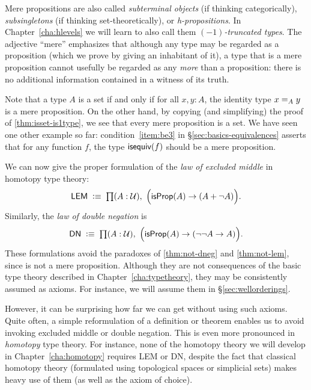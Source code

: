 Mere propositions are also called \emph{subterminal objects} (if thinking categorically), \emph{subsingletons} (if thinking set-theoretically), or \emph{h-propositions}.
In Chapter~\ref{cha:hlevels} we will learn to also call them \emph{$(-1)$-truncated types}.
The adjective ``mere'' emphasizes that although any type may be regarded as a proposition (which we prove by giving an inhabitant of it), a type that is a mere proposition cannot usefully be regarded as any \emph{more} than a proposition: there is no additional information contained in a witness of its truth.

Note that a type $A$ is a set if and only if for all $x,y:A$, the identity type $\id[A]xy$ is a mere proposition.
On the other hand, by copying (and simplifying) the proof of \autoref{thm:isset-is1type}, we see that every mere proposition is a set.
We have seen one other example so far: condition~\ref{item:be3} in \S\ref{sec:basics-equivalences} asserts that for any function $f$, the type $\isequiv (f)$ should be a mere proposition.


We can now give the proper formulation of the \emph{law of excluded middle} in homotopy type theory:
\begin{equation}
  \label{eq:lem}
  \mathsf{LEM}\;\defeq\;
  \prd{A:\UU} \Big(\isprop(A) \to (A + \neg A)\Big).
\end{equation}
Similarly, the \emph{law of double negation} is
\begin{equation}
  \label{eq:ldn}
  \mathsf{DN}\;\defeq\;
  \prd{A:\UU} \Big(\isprop(A) \to (\neg\neg A \to A)\Big).
\end{equation}
These formulations avoid the paradoxes of \autoref{thm:not-dneg} and \autoref{thm:not-lem}, since \bool is not a mere proposition.
Although they are not consequences of the basic type theory described in Chapter~\ref{cha:typetheory}, they may be consistently assumed as axioms.
For instance, we will assume them in \S\ref{sec:wellorderings}.

However, it can be surprising how far we can get without using such axioms.
Quite often, a simple reformulation of a definition or theorem enables us to avoid invoking excluded middle or double negation.
This is even more pronounced in \emph{homotopy} type theory.
For instance, none of the homotopy theory we will develop in Chapter~\ref{cha:homotopy} requires LEM or DN, despite the fact that classical homotopy theory (formulated using topological spaces or simplicial sets) makes heavy use of them (as well as the axiom of choice).


